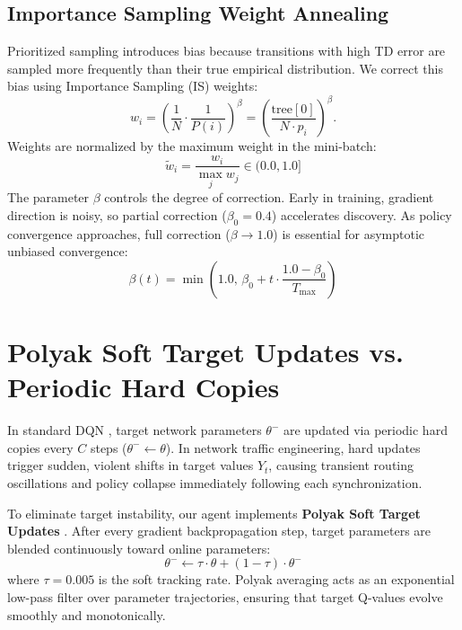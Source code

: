 \subsection{Importance Sampling Weight Annealing}
Prioritized sampling introduces bias because transitions with high TD error are sampled more frequently than their true empirical distribution. We correct this bias using Importance Sampling (IS) weights:
\begin{equation}
    w_i = \left( \frac{1}{N} \cdot \frac{1}{P(i)} \right)^\beta = \left( \frac{\text{tree}[0]}{N \cdot p_i} \right)^\beta.
\end{equation}
Weights are normalized by the maximum weight in the mini-batch:
\begin{equation}
    \tilde{w}_i = \frac{w_i}{\max_j w_j} \in (0.0, 1.0]
\end{equation}
The parameter $\beta$ controls the degree of correction. Early in training, gradient direction is noisy, so partial correction ($\beta_0 = 0.4$) accelerates discovery. As policy convergence approaches, full correction ($\beta \to 1.0$) is essential for asymptotic unbiased convergence:
\begin{equation}
    \beta(t) = \min\left(1.0, \, \beta_0 + t \cdot \frac{1.0 - \beta_0}{T_{\text{max}}}\right)
\end{equation}

\section{Polyak Soft Target Updates vs. Periodic Hard Copies}
In standard DQN \cite{mnih2015human}, target network parameters $\theta^-$ are updated via periodic hard copies every $C$ steps ($\theta^- \gets \theta$). In network traffic engineering, hard updates trigger sudden, violent shifts in target values $Y_t$, causing transient routing oscillations and policy collapse immediately following each synchronization.

To eliminate target instability, our agent implements \textbf{Polyak Soft Target Updates} \cite{lillicrap2015continuous}. After every gradient backpropagation step, target parameters are blended continuously toward online parameters:
\begin{equation}
    \theta^- \gets \tau \cdot \theta + (1 - \tau) \cdot \theta^-
    \label{eq:polyak_update}
\end{equation}
where $\tau = 0.005$ is the soft tracking rate. Polyak averaging acts as an exponential low-pass filter over parameter trajectories, ensuring that target Q-values evolve smoothly and monotonically.

